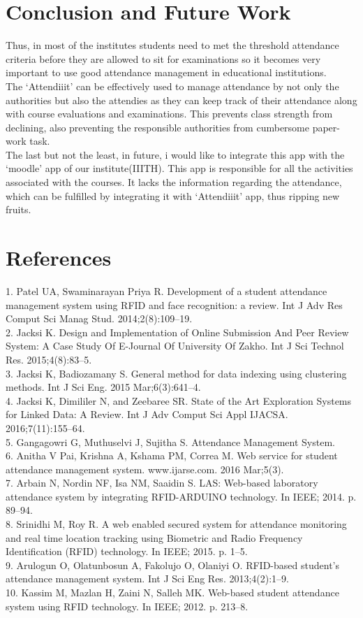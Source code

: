 \documentclass[conference]{IEEEtran}
\begin{document}
\section{Conclusion and Future Work}
Thus, in most of the institutes students need to met the threshold attendance criteria before they are allowed to sit for examinations so it becomes very important to use good attendance management in educational institutions. \\
The `Attendiiit' can be effectively used to manage attendance by not only the authorities but also the attendies as they can keep track of their attendance along with course evaluations and examinations. This prevents class strength from declining, also preventing the responsible authorities from cumbersome paper-work task.\\
The last but not the least, in future, i would like to integrate this app with the `moodle' app of our institute(IIITH). This app is responsible for all the activities associated with the courses. It lacks the information regarding the attendance, which can be fulfilled by integrating it with `Attendiiit' app, thus ripping new fruits. 

\section{References}
1. Patel UA, Swaminarayan Priya R. Development of a student attendance management system using RFID and face recognition: a review. Int J Adv Res Comput Sci Manag Stud. 2014;2(8):109–19.\\
2. Jacksi K. Design and Implementation of Online Submission And Peer Review System: A Case Study Of E-Journal Of University Of Zakho. Int J Sci Technol Res. 2015;4(8):83–5.\\
3. Jacksi K, Badiozamany S. General method for data indexing using clustering methods. Int J Sci Eng. 2015 Mar;6(3):641–4.\\
4. Jacksi K, Dimililer N, and Zeebaree SR. State of the Art Exploration Systems for Linked Data: A Review. Int J Adv Comput Sci Appl IJACSA. 2016;7(11):155–64.\\
5. Gangagowri G, Muthuselvi J, Sujitha S. Attendance Management System.\\
6. Anitha V Pai, Krishna A, Kshama PM, Correa M. Web service for student attendance management system. www.ijarse.com. 2016 Mar;5(3).\\
7. Arbain N, Nordin NF, Isa NM, Saaidin S. LAS: Web-based laboratory attendance system by integrating RFID-ARDUINO technology. In IEEE; 2014. p. 89–94.\\
8. Srinidhi M, Roy R. A web enabled secured system for attendance monitoring and real time location tracking using Biometric and Radio Frequency Identification (RFID) technology. In IEEE; 2015. p. 1–5.\\
9. Arulogun O, Olatunbosun A, Fakolujo O, Olaniyi O. RFID-based student’s attendance management system. Int J Sci Eng Res. 2013;4(2):1–9.\\
10. Kassim M, Mazlan H, Zaini N, Salleh MK. Web-based student attendance system using RFID technology. In IEEE; 2012. p. 213–8.\\
\end{document}
